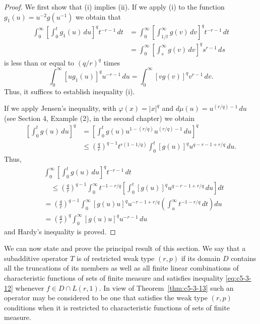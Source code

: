 \begin{proof}
We first show that (i) implies (ii). If we apply (i) to the function
$g_{1}(u) = u^{-2}g(u^{-1})$ we obtain that
\[
\begin{aligned}\int_{0}^{\infty}\left[\int_{0}^{t}g_{1}(u)\,du\right]^{q}t^{-r-1}\,dt
&=\int_{0}^{\infty}\left[\int_{1/t}^{\infty}g(v)\,dv\right]^{q}t^{-r-1}\,dt\\
&=\int_{0}^{\infty}\left[\int_{s}^{\infty}g(v)\,dv\right]^{q}s^{r-1}\,ds\end{aligned}
\]
is less than or equal to $(q/r)^{q}$ times
\[
\int_{0}^{\infty}[ug_{1}(u)]^{q}u^{-r-1}\,du
=\int_{0}^{\infty}[vg(v)]^{q}v^{r-1}\,dv.
\]
Thus, it suffices to establish inequality (i).

If we apply Jensen's inequality, with $\varphi(x) = |x|^{q}$ and
$d\mu(u) = u^{(r/q)-1}\,du$ (see Section 4, Example (2), in the second chapter)
we obtain
\begin{align*}
\left[\int_{0}^{t}g(u)\,du\right]^{q}
&=\left[\int_{0}^{t}g(u)u^{1-(r/q)}u^{(r/q)-1}\,du\right]^{q}\\
&\leq\left(\frac{q}{r}\right)^{q-1}t^{r(1-1/q)}
\int_{0}^{t}[g(u)]^{q}u^{q-r-1+r/q}\,du.
\end{align*}
Thus,
\begin{align*}
&\int_{0}^{\infty}\left[\int_{0}^{t}g(u)\,du\right]^{q}t^{-r-1}\,dt\\
&\quad\leq\left(\frac{q}{r}\right)^{q-1}\int_{0}^{\infty}t^{-1-r/q}
\left[\int_{0}^{t}[g(u)]^{q}u^{q-r-1+r/q}\,du\right]dt\\
&=\left(\frac{q}{r}\right)^{q-1}\int_{0}^{\infty}[g(u)u]^{q}u^{-r-1+r/q}
\left(\int_{u}^{\infty}t^{-1-r/q}\,dt\right)du\\
&=\left(\frac{q}{r}\right)^{q}\int_{0}^{\infty}[g(u)u]^{q}u^{-r-1}\,du
\end{align*}
and Hardy's inequality is proved.
\end{proof}

We can now state and prove the principal result of this section. We say that a
subadditive operator $T$ is of restricted weak type $(r, p)$ if its domain $D$
contains all the truncations of its members as well as all finite linear
combinations of characteristic functions of sets of finite measure and satisfies
inequality \eqref{eq:c5-3-12} whenever $f \in D \cap L(r, 1)$. In view of
Theorem~\ref{thm:c5-3-13} such an operator may be considered to be one that
satisfies the weak type $(r, p)$ conditions when it is restricted to
characteristic functions of sets of finite measure.

